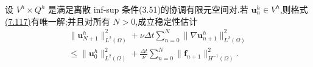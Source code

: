 \begin{lemma}
\label{lem:imex-euler-existence-uniqueness-stability}
设 $V^h\times Q^h$ 是满足离散 inf-sup 条件(3.51)的协调有限元空间对.若 $\bm{u}_n^h\in V^h$,则格式\hyperref[eq:imex-euler-fully-discrete-scheme]{(7.117)}有唯一解;并且对所有 $N>0$,成立稳定性估计
\begin{equation}\label{eq:imex-euler-stability}
\begin{aligned}
 \|\bm{u}_{N+1}^h\|_{L^2(\Omega)}^2
  +\nu\Delta t\sum_{n=0}^{N}
     \|\nabla\bm{u}_{n+1}^h\|_{L^2(\Omega)}^2\\
 \le \|\bm{u}_0^h\|_{L^2(\Omega)}^2
  +\frac{\Delta t}{\nu}\sum_{n=0}^{N}
     \|\bm{f}_{n+1}\|_{H^{-1}(\Omega)}^2.
\end{aligned}
\end{equation}
\end{lemma}

